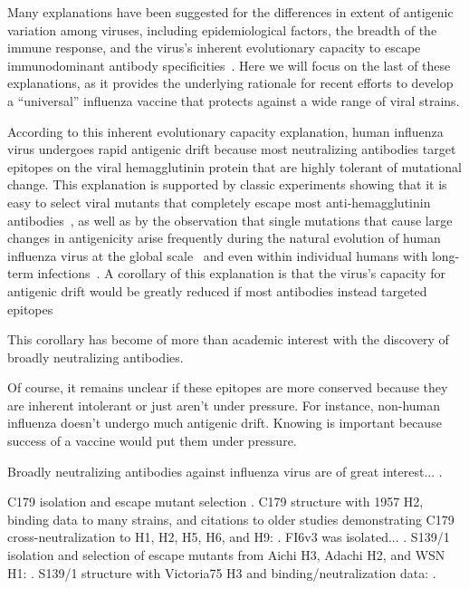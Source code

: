 \documentclass[11pt]{article}
\begin{document}
Many explanations have been suggested for the differences in extent of antigenic variation among viruses, including epidemiological factors, the breadth of the immune response, and the virus's inherent evolutionary capacity to escape immunodominant antibody specificities~\citep{lipsitch2007patterns,cobey2014pathogen,fulton2015mutational}.
Here we will focus on the last of these explanations, as it provides the underlying rationale for recent efforts to develop a ``universal'' influenza vaccine that protects against a wide range of viral strains.

According to this inherent evolutionary capacity explanation, human influenza virus undergoes rapid antigenic drift because most neutralizing antibodies target epitopes on the viral hemagglutinin protein that are highly tolerant of mutational change.
This explanation is supported by classic experiments showing that it is easy to select viral mutants that completely escape most anti-hemagglutinin antibodies~\citep{}, as well as by the observation that single mutations that cause large changes in antigenicity arise frequently during the natural evolution of human influenza virus at the global scale~\cite{?} and even within individual humans with long-term infections~\cite{?}.
A corollary of this explanation is that the virus's capacity for antigenic drift would be greatly reduced if most antibodies instead targeted epitopes 

This corollary has become of more than academic interest with the discovery of broadly neutralizing antibodies.

Of course, it remains unclear if these epitopes are more conserved because they are inherent intolerant or just aren't under pressure.
For instance, non-human influenza doesn't undergo much antigenic drift.
Knowing is important because success of a vaccine would put them under pressure.

Broadly neutralizing antibodies against influenza virus are of great interest... \cite{corti2017tackling}. 

C179 isolation and escape mutant selection \cite{okuno1993common}.
C179 structure with 1957 H2, binding data to many strains, and citations to older studies demonstrating C179 cross-neutralization to H1, H2, H5, H6, and H9:  \cite{dreyfus2013structure}.
FI6v3 was isolated... \cite{corti2011neutralizing}.
S139/1 isolation and selection of escape mutants from Aichi H3, Adachi H2, and WSN H1: \cite{yoshida2009cross}.
S139/1 structure with Victoria75 H3 and binding/neutralization data: \cite{lee2012heterosubtypic}.
\end{document}
